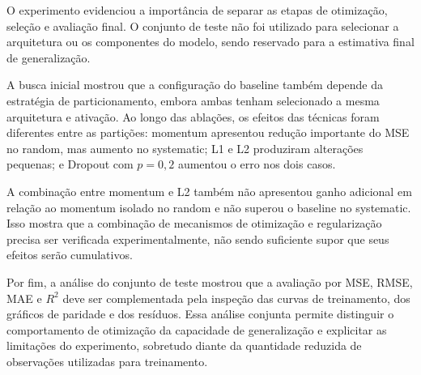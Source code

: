 \documentclass[11pt,a4paper]{article}
\begin{document}
O experimento evidenciou a importância de separar as etapas de
otimização, seleção e avaliação final. O conjunto de teste não foi
utilizado para selecionar a arquitetura ou os componentes do modelo,
sendo reservado para a estimativa final de generalização.

A busca inicial mostrou que a configuração do baseline também depende
da estratégia de particionamento, embora ambas tenham selecionado a
mesma arquitetura e ativação. Ao longo das ablações, os efeitos das
técnicas foram diferentes entre as partições: momentum apresentou
redução importante do MSE no random, mas aumento no systematic; L1 e L2
produziram alterações pequenas; e Dropout com $p=0,2$ aumentou o erro
nos dois casos.

A combinação entre momentum e L2 também não apresentou ganho adicional
em relação ao momentum isolado no random e não superou o baseline no
systematic. Isso mostra que a combinação de mecanismos de otimização e
regularização precisa ser verificada experimentalmente, não sendo
suficiente supor que seus efeitos serão cumulativos.

Por fim, a análise do conjunto de teste mostrou que a avaliação por
MSE, RMSE, MAE e $R^2$ deve ser complementada pela inspeção das curvas
de treinamento, dos gráficos de paridade e dos resíduos. Essa análise
conjunta permite distinguir o comportamento de otimização da capacidade
de generalização e explicitar as limitações do experimento, sobretudo
diante da quantidade reduzida de observações utilizadas para
treinamento.
\end{document}
